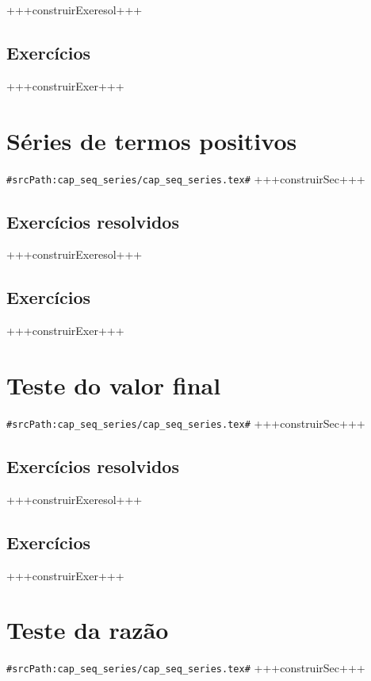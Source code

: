+++construirExeresol+++


\subsection*{Exercícios}

+++construirExer+++


\section{Séries de termos positivos}
\verb+#srcPath:cap_seq_series/cap_seq_series.tex#+
+++construirSec+++

\subsection*{Exercícios resolvidos}

+++construirExeresol+++


\subsection*{Exercícios}

+++construirExer+++


\section{Teste do valor final}
\verb+#srcPath:cap_seq_series/cap_seq_series.tex#+
+++construirSec+++

\subsection*{Exercícios resolvidos}

+++construirExeresol+++


\subsection*{Exercícios}

+++construirExer+++


\section{Teste da razão}
\verb+#srcPath:cap_seq_series/cap_seq_series.tex#+
+++construirSec+++


